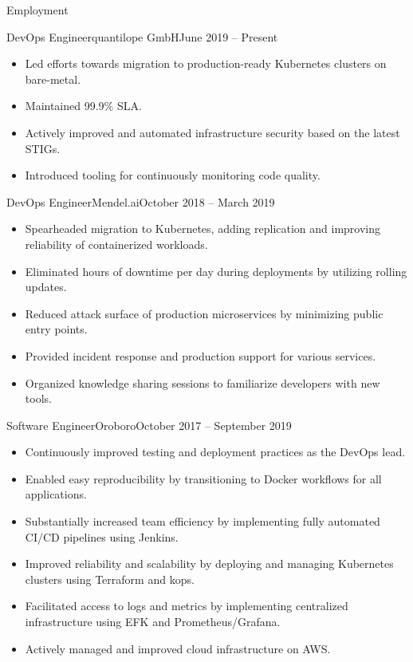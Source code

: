 \documentclass[]{mcdowellcv}
\begin{document}
	\makeheader
	
	\begin{cvsection}{Employment}
		\begin{cvsubsection}{DevOps Engineer}{quantilope GmbH}{June 2019 -- Present}
			\begin{itemize}
				\item Led efforts towards migration to production-ready Kubernetes clusters on bare-metal.
				\item Maintained 99.9\% SLA.
				\item Actively improved and automated infrastructure security based on the latest STIGs.
				\item Introduced tooling for continuously monitoring code quality.
			\end{itemize}
		\end{cvsubsection}
		
		\begin{cvsubsection}{DevOps Engineer}{Mendel.ai}{October 2018 -- March 2019}	
			\begin{itemize}
				\item Spearheaded migration to Kubernetes, adding replication and improving reliability of containerized workloads.
				\item Eliminated hours of downtime per day during deployments by utilizing rolling updates.
				\item Reduced attack surface of production microservices by minimizing public entry points.
				\item Provided incident response and production support for various services.
				\item Organized knowledge sharing sessions to familiarize developers with new tools.
			\end{itemize}
		\end{cvsubsection}
		
		\begin{cvsubsection}{Software Engineer}{Oroboro}{October 2017 -- September 2019}		
			\begin{itemize}
				\item Continuously improved testing and deployment practices as the DevOps lead.
				\item Enabled easy reproducibility by transitioning to Docker workflows for all applications.
				\item Substantially increased team efficiency by implementing fully automated CI/CD pipelines using Jenkins.
				\item Improved reliability and scalability by deploying and managing Kubernetes clusters using Terraform and kops.
				\item Facilitated access to logs and metrics by implementing centralized infrastructure using EFK and Prometheus/Grafana.
				\item Actively managed and improved cloud infrastructure on AWS.
			\end{itemize}
		\end{cvsubsection}
		

\end{cvsection}
\end{document}
